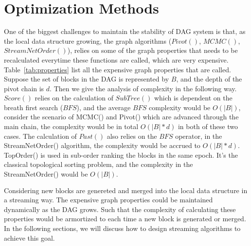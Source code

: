 \section{Optimization Methods}
One of the biggest challenges to maintain the stability of DAG system is that, 
as the local data structure growing, the graph algorithms ($Pivot()$, $MCMC()$, $StreamNetOrder()$), 
relies on some of the graph properties that needs to be recalculated everytime these functions are called,
which are very expensive. 
Table~\ref{tab:properties} list all the expensive graph properties that are called. 
Suppose the set of blocks in the DAG is represented by $B$, and the depth of the pivot chain is $d$.
Then we give the analysis of complexity in the following way. 
$Score()$ relies on the calculation of $SubTree()$ which is dependent on the breath first search ($BFS$), and the average $BFS$
complexity would be $O(|B|)$, consider the scenario of MCMC() and Pivot() which are advanced through the main chain,
the complexity would be in total $O(|B|*d)$ in both of these two cases.
The calculation of $Past()$ also relies on the $BFS$ operator, in the StreamNetOrder() algorithm, the complexity would be 
accrued to $O(|B| * d)$.
TopOrder() is used in sub-order ranking the blocks in the same epoch.
It's the classical topological sorting problem, and the complexity in the StreamNetOrder() would be $O(|B|)$.

\begin{table}[]
\caption {Analysis of Graph properties calculation} \label{tab:properties}
\begin{center}
\end{center}
\end{table}



Considering new blocks are genereted and merged into the local data structure in a streaming way.
The expensive graph properties could be maintained dynamically as the DAG grows.
Such that the complexity of calculating these properties would be armortized to each time a new block is generated or merged.
In the following sections, we will discuss how to design streaming algorithms to achieve this goal.

